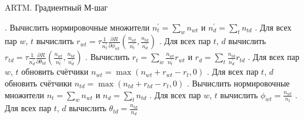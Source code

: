 \documentclass[12pt]{article}
\begin{document}
\begin{algorithm}
\caption{ARTM. Градиентный М-шаг}\label{malgo3}
\begin{algorithmic}[]
. Вычислить нормировочные множители $n^{\prime}_t = \sum_w n_{wt}$ и $n^{\prime}_d = \sum_t n_{td}$
. Для всех пар $w$, $t$ вычислить $r_{wt}= \tau \frac{1}{n^{\prime}_t} \frac{\partial{R}}{\partial{\phi_{wt}}}(\frac{n_{wt}}{n^{\prime}_t}, \frac{n_{td}}{n^{\prime}_d})$
. Для всех пар $t$, $d$ вычислить $r_{td}= \tau \frac{1}{n^{\prime}_d} \frac{\partial{R}}{\partial{\theta_{td}}}(\frac{n_{wt}}{n^{\prime}_t}, \frac{n_{td}}{n^{\prime}_d})$
. Вычислить $r_t = \sum_w \frac{n_{wt}}{n^{\prime}_t} r_{wt}$ и $r_d = \sum_t \frac{n_{td}}{n^{\prime}_d} r_{td}$
. Для всех пар $w$, $t$ обновить счётчики $n_{wt} = \max(n_{wt} + r_{wt} - r_t, 0)$
. Для всех пар $t$, $d$ обновить счётчики $n_{td} = \max(n_{td} + r_{td} - r_t, 0)$
. Вычислить нормировочные множители $n_t = \sum_w n_{wt}$ и $n_d = \sum_t n_{td}$
. Для всех пар $w$, $t$ вычислить $\phi_{wt} = \frac{n_{wt}}{n_t}$
. Для всех пар $t$, $d$ вычислить $\theta_{td} = \frac{n_{td}}{n_d}$
\EndProcedure
\end{algorithmic}
\end{algorithm}\ \\
\newpage

	
\end{document}
